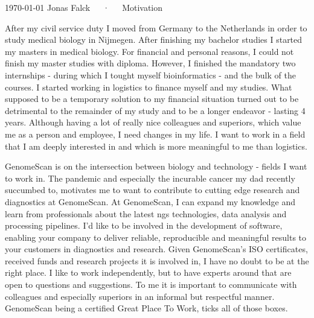 \documentclass[11pt, a4paper]{awesome-cv}
\begin{document}
\makecvheader[R]

\makecvfooter
  {\today}
  {Jonas Falck~~~·~~~Motivation}
  {}

\makelettertitle

\begin{cvletter}

After my civil service duty I moved from Germany to the Netherlands in order to study medical biology in Nijmegen. After finishing my bachelor studies I started my masters in medical biology.
For financial and personal reasons, I could not finish my master studies with diploma.
However, I finished the mandatory two internships - during which I tought myself bioinformatics - and the bulk of the courses.
I started working in logistics to finance myself and my studies.
What supposed to be a temporary solution to my financial situation turned out to be detrimental to the remainder of my study and to be a longer endeavor - lasting 4 years.
Although having a lot of really nice colleagues and superiors, which value me as a person and employee, I need changes in my life.
I want to work in a field that I am deeply interested in and which is more meaningful to me than logistics.

GenomeScan is on the intersection between biology and technology - fields I want to work in.
The pandemic and especially the incurable cancer my dad recently succumbed to, motivates me to want to contribute to cutting edge research and diagnostics at GenomeScan.
At GenomeScan, I can expand my knowledge and learn from professionals about the latest ngs technologies, data analysis and processing pipelines.
I'd like to be involved in the development of software, enabling your company to deliver reliable, reproducible and meaningful results to your customers in diagnostics and research.
Given GenomeScan's ISO certificates, received funds and research projects it is involved in, I have no doubt to be at the right place.
I like to work independently, but to have experts around that are open to questions and suggestions.
To me it is important to communicate with colleagues and especially superiors in an informal but respectful manner.
GenomeScan being a certified Great Place To Work, ticks all of those boxes.


\end{cvletter}
\end{document}
